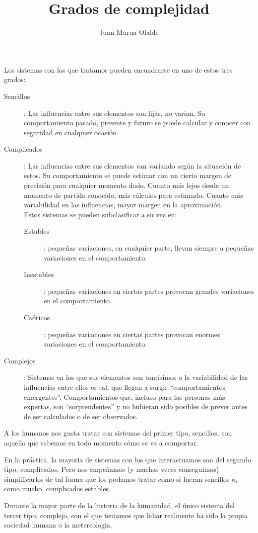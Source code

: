 \documentclass[10pt,a4paper]{article}
\author{Juan Murua Olalde}
\title{Grados de complejidad}
\begin{document}
Los sistemas con los que tratamos pueden encuadrarse en uno de estos tres grados:
\begin{description}

\item[Sencillos]: Las influencias entre sus elementos son fijas, no varian. Su comportamiento pasado, presente y futuro se puede calcular y conocer con seguridad en cualquier ocasión.

\item[Complicados]: Las influencias entre sus elementos van variando según la situación de estos. Su comportamiento se puede estimar con un cierto margen de precisión para cualquier momento dado. Cuanto más lejos desde un momento de partida conocido, más cálculos para estimarlo. Cuanto más variabilidad en las influencias, mayor margen en la aproximación.
\\Estos sistemas se pueden subclasificar a su vez en:
\begin{description}
\item[Estables]: pequeñas variaciones, en cualquier parte, llevan siempre a pequeñas variaciones en el comportamiento.
\item[Inestables]: pequeñas variaciones en ciertas partes provocan grandes variaciones en el comportamiento.
\item[Caóticos]: pequeñas variaciones en ciertas partes provocan enormes variaciones en el comportamiento.
\end{description}

\item[Complejos]: Sistemas en los que sus elementos son tantísimos o la variabilidad de las influencias entre ellos es tal, que llegan a surgir ``comportamientos emergentes''. Comportamientos que, incluso para las personas más expertas, son ``sorprendentes'' y no hubieran sido posibles de prever antes de ser calculados o de ser observados.

\end{description}

A los humanos nos gusta tratar con sistemas del primer tipo, sencillos, con aquello que sabemos en todo momento cómo se va a comportar.

En la práctica, la mayoria de sistemas con los que interactuamos son del segundo tipo, complicados. Pero nos empeñamos (y muchas veces conseguimos) simplificarlos de tal forma que los podamos tratar como si fueran sencillos o, como mucho, complicados estables.

Durante la mayor parte de la historia de la humanidad, el único sistema del tercer tipo, complejo, con el que teniamos que lidiar realmente ha sido la propia sociedad humana o la metereologia. 
\end{document}

